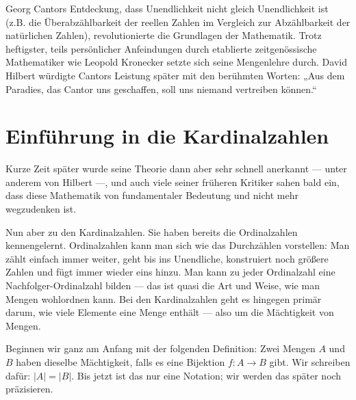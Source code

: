\begin{didactic-insight}
Georg Cantors Entdeckung, dass Unendlichkeit nicht gleich Unendlichkeit ist (z.B. die Überabzählbarkeit der reellen Zahlen im Vergleich zur Abzählbarkeit der natürlichen Zahlen), revolutionierte die Grundlagen der Mathematik. Trotz heftigster, teils persönlicher Anfeindungen durch etablierte zeitgenössische Mathematiker wie Leopold Kronecker setzte sich seine Mengenlehre durch. David Hilbert würdigte Cantors Leistung später mit den berühmten Worten: „Aus dem Paradies, das Cantor uns geschaffen, soll uns niemand vertreiben können.“
\end{didactic-insight}

\section{Einführung in die Kardinalzahlen}

\begin{spoken-clean}[00:15:23 - 00:17:00]
Kurze Zeit später wurde seine Theorie dann aber sehr schnell anerkannt --- unter anderem von Hilbert ---, und auch viele seiner früheren Kritiker sahen bald ein, dass diese Mathematik von fundamentaler Bedeutung und nicht mehr wegzudenken ist.

Nun aber zu den Kardinalzahlen. Sie haben bereits die Ordinalzahlen kennengelernt. Ordinalzahlen kann man sich wie das Durchzählen vorstellen: Man zählt einfach immer weiter, geht bis ins Unendliche, konstruiert noch größere Zahlen und fügt immer wieder eins hinzu. Man kann zu jeder Ordinalzahl eine Nachfolger-Ordinalzahl bilden --- das ist quasi die Art und Weise, wie man Mengen wohlordnen kann. Bei den Kardinalzahlen geht es hingegen primär darum, wie viele Elemente eine Menge enthält --- also um die Mächtigkeit von Mengen.

Beginnen wir ganz am Anfang mit der folgenden Definition: Zwei Mengen $A$ und $B$ haben dieselbe Mächtigkeit, falls es eine Bijektion $f \colon A \to B$ gibt. Wir schreiben dafür: $|A| = |B|$. Bis jetzt ist das nur eine Notation; wir werden das später noch präzisieren.
\end{spoken-clean}

